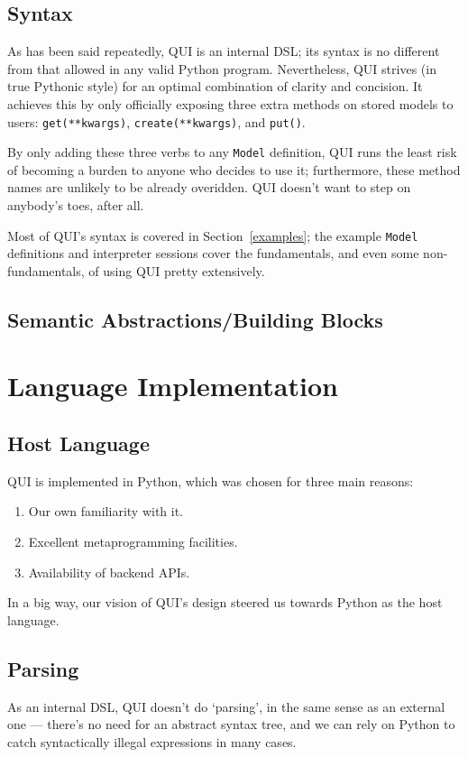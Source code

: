 \documentclass{article} %
\newcommand{\il}[1]{\mbox{\lstinline{#1}}}
\begin{document}
\subsection{Syntax}
As has been said repeatedly, QUI is an internal DSL; its syntax is no different from that allowed in any valid Python program. 
Nevertheless, QUI strives (in true Pythonic style) for an optimal combination of clarity and concision. It achieves this by only officially 
exposing three extra methods on stored models to users: \il{get(**kwargs)}, \il{create(**kwargs)}, and \il{put()}.

By only adding these three verbs to any \il{Model} definition, QUI runs the least risk of becoming a burden to anyone who decides to use
it; furthermore, these method names are unlikely to be already overidden. QUI doesn't want to step on anybody's toes, after all. 

Most of QUI's syntax is covered in Section~\ref{examples}; the example \il{Model} definitions and interpreter sessions cover the fundamentals,
and even some non-fundamentals, of using QUI pretty extensively. 

\subsection{Semantic Abstractions/Building Blocks}


\section{Language Implementation}
\subsection{Host Language}
QUI is implemented in Python, which was chosen for three main reasons:
\begin{enumerate}
\item Our own familiarity with it.
\item Excellent metaprogramming facilities.
\item Availability of backend APIs.
\end{enumerate}
In a big way, our vision of QUI's design steered us towards Python as the host language. 

\subsection{Parsing}
As an internal DSL, QUI doesn't do `parsing', in the same sense as an external one --- there's no need for an abstract syntax tree, and we can rely on Python to catch syntactically 
illegal expressions in many cases.
\end{document}
